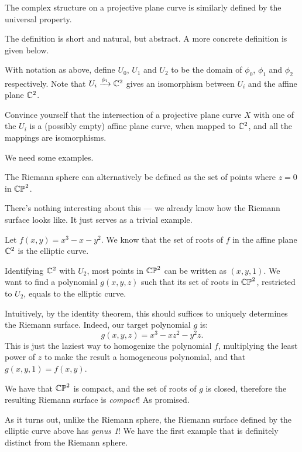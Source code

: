 The complex structure on a projective plane curve is similarly defined by the universal property.

The definition is short and natural, but abstract. A more concrete definition is given below.
\begin{ques}
	With notation as above, define $U_0$, $U_1$ and $U_2$ to be the domain of $\phi_0$, $\phi_1$ and
	$\phi_2$ respectively.
	Note that $U_i \xrightarrow{\phi_i} \mathbb C^2$ gives an isomorphism between $U_i$ and the affine plane
	$\mathbb C^2$.

	Convince yourself that the intersection of a projective plane curve $X$ with one of the $U_i$ is
	a (possibly empty) affine plane curve, when mapped to $\mathbb C^2$, and all the mappings are
	isomorphisms.
\end{ques}

We need some examples.

\begin{example}
	The Riemann sphere can alternatively be defined as the set of points where $z = 0$ in $\mathbb{CP}^2$.

	There's nothing interesting about this --- we already know how the Riemann surface looks like.
	It just serves as a trivial example.
\end{example}

\begin{example}
	Let $f(x, y) = x^3-x-y^2$. We know that the set of roots of $f$ in the affine plane $\mathbb C^2$ is
	the elliptic curve.

	Identifying $\mathbb C^2$ with $U_2$, most points in $\mathbb{CP}^2$ can be written as $(x, y, 1)$.
	We want to find a polynomial $g(x, y, z)$ such that its set of roots in $\mathbb{CP}^2$, restricted to
	$U_2$, equals to the elliptic curve.

	Intuitively, by the identity theorem, this should suffices to uniquely determines the Riemann
	surface. Indeed, our target polynomial $g$ is:
	\[ g(x, y, z) = x^3-xz^2-y^2 z.  \]
	This is just the laziest way to homogenize the polynomial $f$, multiplying the least power of
	$z$ to make the result a homogeneous polynomial, and that $g(x, y, 1) = f(x, y)$.

	We have that $\mathbb{CP}^2$ is compact, and the set of roots of $g$ is closed, therefore the resulting
	Riemann surface is \emph{compact}! As promised.
\end{example}

As it turns out, unlike the Riemann sphere, the Riemann surface defined by the elliptic curve above
has \emph{genus 1}! We have the first example that is definitely distinct from
the Riemann sphere.

